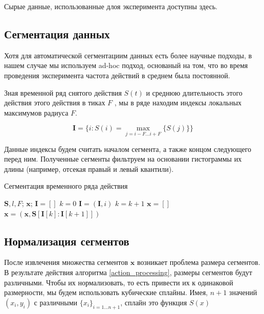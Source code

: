\documentclass[12pt, fleqn, unicode]{article}
\newcommand{\bx}{\mathbf{x}}
\newcommand{\bI}{\mathbf{I}}
\newcommand{\bS}{\mathbf{S}}
\begin{document}
Сырые данные, использованные длоя эксперимента доступны здесь.

\subsection{Сегментация данных}

Хотя для автоматической сегментациим данных есть более научные подходы,
в нашем случае мы используем ad-hoc подход, основаный на том, что во время
проведения эксперимента частота действий в среднем была постоянной.

Зная временной ряд снятого действия $S(t)$ и среднюю длительность
этого действия этого действия в тиках $F$ ,
мы в ряде находим индексы локальных максимумов радиуса $F$.

$$
\bI = \{i: S(i) = \max_{j=i - F \ldots i + F}\{S(j)\}\}
$$

Данные индексы будем считать началом сегмента, а также концом следующего перед ним.
Полученные сегменты фильтруем на основании гистограммы их длины (например,
отсекая правый и левый квантили).

\begin{center}
    \begin{algorithm}[h]
    \caption{Сегментация временного ряда действия}
        \label{action_processing}
    \begin{algorithmic}[1]
    \REQUIRE $\bS, l, F$;
    \ENSURE $\bx$;
    \STATE $\bI = []$
    \STATE $k = 0$
        \STATE $ \bI = (\bI, i)$
        \STATE $ k = k + 1$
    \ENDIF
    \ENDFOR
    \STATE $\bx = []$
        \STATE $\bx = (\bx, \bS[\bI[k]:\bI[k + 1]])$
    \ENDFOR
\end{algorithmic}
\end{algorithm}
\end{center}

\subsection{Нормализация сегментов}

После извлечения множества сегментов $\bx$ возникает проблема размера сегментов.
В результате действия алгоритма \ref{action_processing}, размеры сегментов
будут различными. Чтобы их нормализовать, то есть привести их к одинаковой
размерности, мы будем использовать кубические сплайны. Имея, $n + 1$ значений
$(x_i, y_i)$ с различными $\{x_i\}_{i=1\ldots n + 1}$, сплайн это функция $S(x)$
\end{document}
